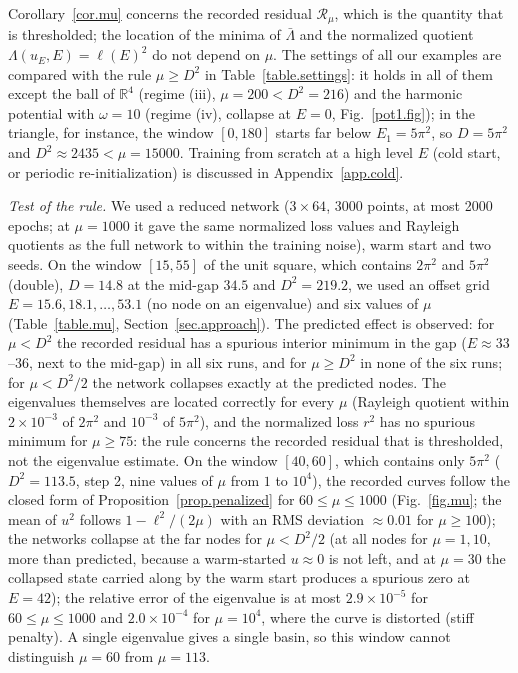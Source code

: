 \documentclass[10pt]{amsart}
\theoremstyle{definition}
\theoremstyle{remark}
\theoremstyle{plain}
\newcommand{\R}{\mathbb{R}}
\begin{document}
Corollary~\ref{cor.mu} concerns the recorded residual $\mathcal R_\mu$, which is the quantity that is
thresholded; the location of the minima of $\bar\Lambda$ and the normalized quotient
$\Lambda(u_E,E)=\ell(E)^2$ do not depend on $\mu$. The settings of all our examples are compared with the
rule $\mu\ge D^2$ in Table~\ref{table.settings}: it holds in all of them except the ball of $\R^4$ (regime
(iii), $\mu=200<D^2=216$) and the harmonic potential with $\omega=10$ (regime (iv), collapse at $E=0$,
Fig.~\ref{pot1.fig}); in the triangle, for instance, the window $[0,180]$ starts far below $E_1=5\pi^2$, so
$D=5\pi^2$ and $D^2\approx2435<\mu=15000$. Training from scratch at a high level $E$ (cold start, or
periodic re-initialization) is discussed in Appendix~\ref{app.cold}.

\emph{Test of the rule.} We used a reduced network ($3\times64$, 3000 points, at most 2000 epochs; at
$\mu=1000$ it gave the same normalized loss values and Rayleigh quotients as the full network to within
the training noise), warm start and two seeds. On the window $[15,55]$ of the unit square, which
contains $2\pi^2$ and $5\pi^2$ (double), $D=14.8$ at the mid-gap $34.5$ and $D^2=219.2$, we used an offset
grid $E=15.6,18.1,\dots,53.1$ (no node on an eigenvalue) and six values of $\mu$ (Table~\ref{table.mu}, Section~\ref{sec.approach}).
The predicted effect is observed: for $\mu<D^2$ the recorded residual has a spurious interior minimum in
the gap ($E\approx33$--$36$, next to the mid-gap) in all six runs, and for $\mu\ge D^2$ in none of the six
runs; for $\mu<D^2/2$ the network collapses exactly at the predicted nodes. The eigenvalues themselves
are located correctly for every $\mu$ (Rayleigh quotient within $2\times10^{-3}$ of $2\pi^2$ and $10^{-3}$ of
$5\pi^2$), and the normalized loss $r^2$ has no spurious minimum for $\mu\ge75$: the rule concerns the
recorded residual that is thresholded, not the eigenvalue estimate. On the window $[40,60]$, which
contains only $5\pi^2$ ($D^2=113.5$, step 2, nine values of $\mu$ from $1$ to $10^4$), the recorded curves
follow the closed form of Proposition~\ref{prop.penalized} for $60\le\mu\le1000$ (Fig.~\ref{fig.mu}; the
mean of $u^2$ follows $1-\ell^2/(2\mu)$ with an RMS deviation $\approx0.01$ for $\mu\ge100$); the networks
collapse at the far nodes for $\mu<D^2/2$ (at all nodes for $\mu=1,10$, more than predicted, because a
warm-started $u\approx0$ is not left, and at $\mu=30$ the collapsed state carried along by the warm start
produces a spurious zero at $E=42$); the relative error of the eigenvalue is at most $2.9\times10^{-5}$ for
$60\le\mu\le1000$ and $2.0\times10^{-4}$ for $\mu=10^4$, where the curve is distorted (stiff penalty). A
single eigenvalue gives a single basin, so this window cannot distinguish $\mu=60$ from $\mu=113$.
\end{document}
